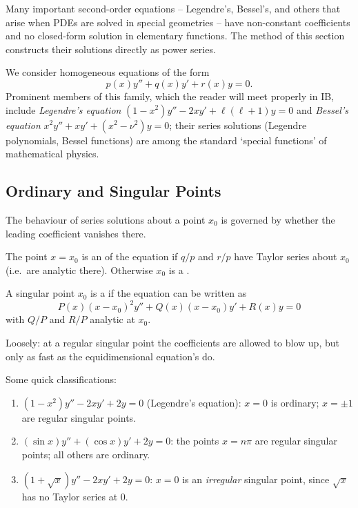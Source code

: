 \documentclass[a4paper]{scrartcl}
\begin{document}
Many important second-order equations -- Legendre's, Bessel's, and others that arise when PDEs are solved in special geometries -- have non-constant coefficients and no closed-form solution in elementary functions. The method of this section constructs their solutions directly as power series.

We consider homogeneous equations of the form
$$
p(x) y'' + q(x) y' + r(x) y = 0.
$$
Prominent members of this family, which the reader will meet properly in IB, include \emph{Legendre's equation} $(1 - x^2)y'' - 2xy' + \ell(\ell+1) y = 0$ and \emph{Bessel's equation} $x^2 y'' + xy' + (x^2 - \nu^2)y = 0$; their series solutions (Legendre polynomials, Bessel functions) are among the standard `special functions' of mathematical physics.

\subsection{Ordinary and Singular Points}

The behaviour of series solutions about a point $x_0$ is governed by whether the leading coefficient vanishes there.

\begin{definition}
	The point $x = x_0$ is an  of the equation if $q/p$ and $r/p$ have Taylor series about $x_0$ (i.e.\ are analytic there). Otherwise $x_0$ is a .

	A singular point $x_0$ is a  if the equation can be written as
	$$
	P(x) (x - x_0)^2 y'' + Q(x)(x - x_0) y' + R(x) y = 0
	$$
	with $Q/P$ and $R/P$ analytic at $x_0$.
\end{definition}

Loosely: at a regular singular point the coefficients are allowed to blow up, but only as fast as the equidimensional equation's do.

\begin{example}
	Some quick classifications:
	\begin{enumerate}[label=(\roman*)]
		\item $(1 - x^2)y'' - 2xy' + 2y = 0$ (Legendre's equation): $x = 0$ is ordinary; $x = \pm 1$ are regular singular points.
		\item $(\sin x) y'' + (\cos x) y' + 2y = 0$: the points $x = n\pi$ are regular singular points; all others are ordinary.
		\item $(1 + \sqrt x) y'' - 2xy' + 2y = 0$: $x = 0$ is an \emph{irregular} singular point, since $\sqrt x$ has no Taylor series at $0$.
	\end{enumerate}
\end{example}
\end{document}
